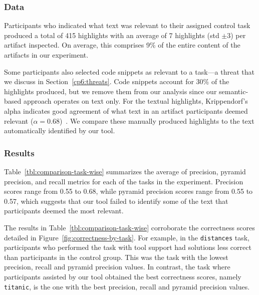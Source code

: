 \subsubsection{Data}

Participants who indicated what text was relevant to their assigned control task produced a total of 415 highlights with an average of 7 highlights (std $\pm 3$) per artifact inspected.
On average, this comprises 9\% of the entire content of the artifacts in our experiment. 


Some participants also selected code snippets as relevant to a task---a threat that we discuss in Section~\ref{cp6:threats}. 
Code snippets account for 30\% of the highlights produced, but we remove them from our analysis since our semantic-based approach 
operates on text only. For the textual highlights,
Krippendorf's alpha indicates good agreement of what text in an artifact participants deemed relevant ($\alpha = 0.68$)~\cite{Krippendorff1980, passonneau2006}.
We compare these manually produced highlights to the text automatically identified by our tool.





\subsubsection{Results}



Table~\ref{tbl:comparison-task-wise} summarizes the average of precision, pyramid precision, and recall metrics for each of the tasks in the experiment.
Precision scores range from 0.55 to 0.68, while pyramid precision scores range from 0.55 to 0.57, which suggests that our tool failed to identify some of the text that participants deemed the most relevant.



The results in Table~\ref{tbl:comparison-task-wise} corroborate 
the correctness scores detailed in Figure~\ref{fig:correctness-by-task}. For example, 
in the \texttt{distances} task, participants who performed the task with tool support had solutions less correct than participants in the control group.
This was the task with the lowest precision, recall and pyramid precision values. 
In contrast, the task where participants assisted by our tool obtained the best correctness scores, namely \texttt{titanic}, is the one with the best precision, recall and pyramid precision values.





